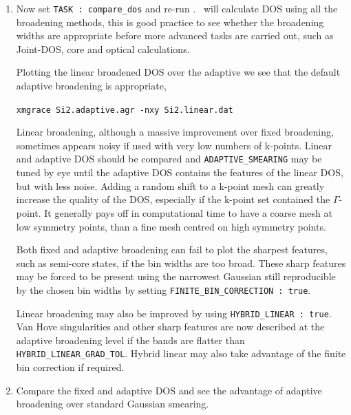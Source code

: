 \documentclass[a4paper,11pt,twoside]{book}
\begin{document}
{\begin{enumerate}
Increasing the number of integration points has improved the band energy of the adaptive smearing:
\begin{verbatim}
|          Band energy (Adaptive broadening) :       1.3623 eV         <- BEA |
\end{verbatim}


\item  Now set {\tt TASK : compare\_dos} and re-run \optados. \optados\ will calculate DOS using all the broadening methods, this is good practice to see whether the broadening widths are appropriate before more advanced tasks are carried out, such as Joint-DOS, core and optical calculations.

Plotting the linear broadened DOS over the adaptive we see that the default adaptive broadening is appropriate,

\verb#xmgrace Si2.adaptive.agr -nxy Si2.linear.dat#

Linear broadening, although a massive improvement over fixed broadening, sometimes appears noisy if used with very low numbers of k-points. Linear and adaptive DOS should be compared and \verb#ADAPTIVE_SMEARING# may be tuned by eye until the adaptive DOS contains the features of the linear DOS, but with less noise.  Adding a random shift to a k-point mesh can greatly increase the quality of the DOS, especially if the k-point set contained the $\Gamma$-point. It generally pays off in computational time to have a coarse mesh at low symmetry points, than a fine mesh centred on high symmetry points.

Both fixed and adaptive broadening can fail to plot the sharpest features, such as semi-core states, if the bin widths are too broad. These sharp features may be forced to be present using the narrowest Gaussian still reproducible by the chosen bin widths by setting \verb#FINITE_BIN_CORRECTION : true#.

Linear broadening may also be improved by using \verb#HYBRID_LINEAR : true#. Van Hove singularities and other sharp features are now described at the adaptive broadening level if the bands are flatter than \verb#HYBRID_LINEAR_GRAD_TOL#. Hybrid linear may also take advantage of the finite bin correction if required.

\item Compare the fixed and adaptive DOS and see the advantage of adaptive broadening over standard Gaussian smearing.

\end{enumerate}


}
\end{document}
